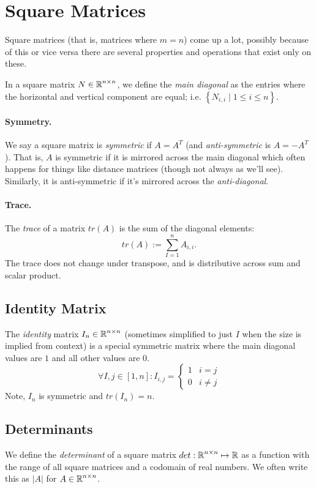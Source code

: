 \section{Square Matrices}
Square matrices (that is, matrices where $m=n$) come up a lot, 
possibly because of this or vice versa there are several properties and operations that exist only on these. 

In a square matrix $N\in\operatorname{\mathbb{R}}^{n\times n}$, we define the \emph{main diagonal} as the entries where the horizontal and vertical component are equal; 
i.e. $\left\{N_{i,i} \mid 1 \le i \le n\right\}$. 

\paragraph{Symmetry.}
We say a square matrix is \emph{symmetric} if $A=A^T$
(and \textit{anti-symmetric} is $A = -A^T$). 
That is, $A$ is symmetric if it is mirrored across the main diagonal which often happens for things like distance matrices (though not always as we'll see). 
Similarly, it is anti-symmetric if it's mirrored across the \textit{anti-diagonal}.

\paragraph{Trace. }
The \emph{trace} of a matrix $tr(A)$ is the sum of the diagonal elements: \[tr(A) := \sum_{I=1}^n A_{i,i}.\] 
The trace does not change under transpose, and is distributive across sum and scalar product. 

\subsection{Identity Matrix}

The \emph{identity} matrix $I_n \in\operatorname{\mathbb{R}}^{n\times n}$ (sometimes simplified to just $I$ when the size is implied from context) 
is a special symmetric matrix where the main diagonal values are $1$ and all other values are $0$.
\[
\forall I,j \in [1,n]: I_{i,j} = \begin{cases} 1 & i=j\\ 0 & i\ne j\end{cases}
\]
Note, $I_n$ is symmetric and $tr(I_n)=n$.


\subsection{Determinants}
We define the \emph{determinant} of a square matrix $det: \operatorname{\mathbb{R}}^{n\times n} \mapsto \operatorname{\mathbb{R}}$ 
as a function with the range of all square matrices and a codomain of real numbers. 
We often write this as $|A|$ for $A\in\operatorname{\mathbb{R}}^{n\times n}$. 

